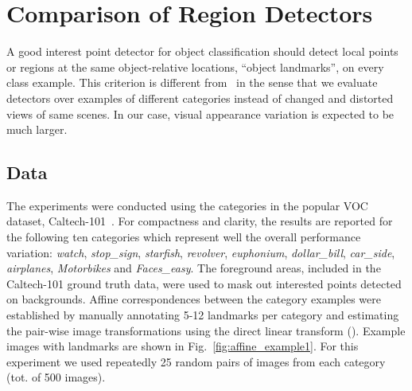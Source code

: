 \documentclass[preprint,authoryear,review]{elsarticle}
\begin{document}
%
\section{Comparison of Region Detectors}
%
A good interest point detector for object classification should detect local
points or regions at the same object-relative locations, ``object landmarks'', on every
class example.
This criterion is different from~\cite{MikTuySch:2005}
in the sense that we evaluate detectors over examples of different 
categories instead of changed and distorted views of same scenes. In our case, visual appearance
variation is expected to be much larger.

%
\subsection{Data\label{sec:data}}
%
The experiments were conducted using the categories in the popular VOC dataset, Caltech-101~\cite{FeiFerPer:2006}.
For compactness and clarity, the results are reported for the following ten categories which
represent well the overall performance variation: \textit{watch}, \textit{stop\_sign}, \textit{starfish},
\textit{revolver}, \textit{euphonium}, \textit{dollar\_bill}, \textit{car\_side},
\textit{airplanes}, \textit{Motorbikes} and \textit{Faces\_easy}. The foreground areas,
included in the Caltech-101 ground truth data, were used to mask out interested points detected
on backgrounds.
Affine correspondences between the category examples were established
by manually annotating 5-12 landmarks per category and estimating the pair-wise image transformations
using the direct linear transform (\cite{HarZis:2003}). Example images with landmarks are shown
in Fig.~\ref{fig:affine_example1}.
%
For this experiment we used repeatedly 25 random pairs of images from each category (tot. of 500 images).
\end{document}

